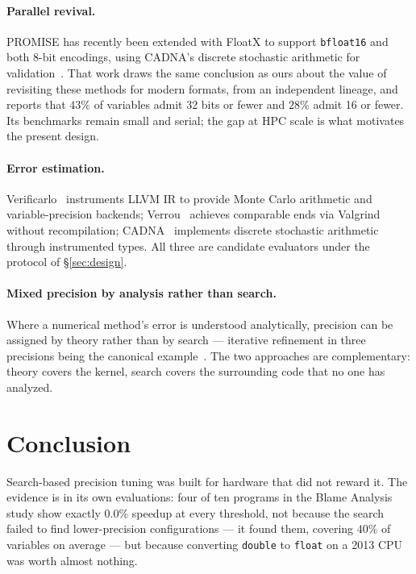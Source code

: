 \documentclass[11pt]{article}
\begin{document}
\paragraph{Parallel revival.} PROMISE has recently been extended with FloatX to
support \texttt{bfloat16} and both 8-bit encodings, using CADNA's discrete
stochastic arithmetic for validation~\cite{promise2026}. That work draws the
same conclusion as ours about the value of revisiting these methods for modern
formats, from an independent lineage, and reports that $43\%$ of variables admit
32 bits or fewer and $28\%$ admit 16 or fewer. Its benchmarks remain small and
serial; the gap at HPC scale is what motivates the present design.

\paragraph{Error estimation.} Verificarlo~\cite{verificarlo} instruments LLVM IR
to provide Monte Carlo arithmetic and variable-precision backends;
Verrou~\cite{verrou} achieves comparable ends via Valgrind without recompilation;
CADNA~\cite{cadna} implements discrete stochastic arithmetic through instrumented
types. All three are candidate evaluators under the protocol of
\S\ref{sec:design}.

\paragraph{Mixed precision by analysis rather than search.} Where a numerical
method's error is understood analytically, precision can be assigned by theory
rather than by search --- iterative refinement in three precisions being the
canonical example~\cite{carsonhigham}. The two approaches are complementary:
theory covers the kernel, search covers the surrounding code that no one has
analyzed.

\section{Conclusion}

Search-based precision tuning was built for hardware that did not reward it. The
evidence is in its own evaluations: four of ten programs in the Blame Analysis
study show exactly $0.0\%$ speedup at every threshold, not because the search
failed to find lower-precision configurations --- it found them, covering $40\%$
of variables on average --- but because converting \texttt{double} to
\texttt{float} on a 2013 CPU was worth almost nothing.
\end{document}
